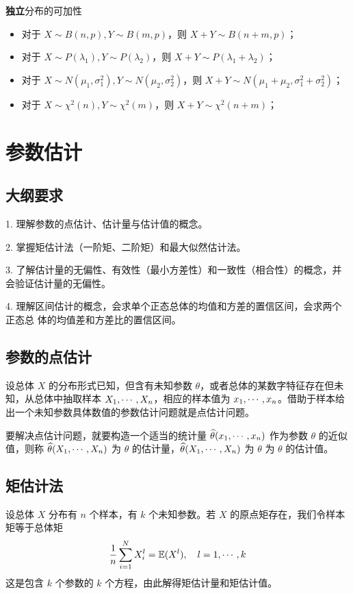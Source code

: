 \textbf{独立}分布的可加性
\begin{itemize}
	\item 对于 $X \sim B(n,p), Y \sim B(m, p)$，则 $X+Y \sim B(n+m,p)$；
	\item 对于 $X \sim P(\lambda_1), Y \sim P(\lambda_2)$，则 $X+Y \sim P(\lambda_1 + \lambda_2)$；
	\item 对于 $X \sim N(\mu_1, \sigma_1^2), Y \sim N(\mu_2, \sigma_2^2)$，则 $X+Y \sim N(\mu_1+\mu_2, \sigma_1^2+\sigma_2^2)$；
	\item 对于 $X \sim \chi^2(n), Y \sim \chi^2(m)$，则 $X+Y \sim \chi^2(n+m)$；
\end{itemize}

\section{参数估计}

\subsection{大纲要求}

1. 理解参数的点估计、估计量与估计值的概念。

2. 掌握矩估计法（一阶矩、二阶矩）和最大似然估计法。

3. 了解估计量的无偏性、有效性（最小方差性）和一致性（相合性）的概念，并会验证估计量的无偏性。

4. 理解区间估计的概念，会求单个正态总体的均值和方差的置信区间，会求两个正态总
体的均值差和方差比的置信区间。

\subsection{参数的点估计}

设总体 $X$ 的分布形式已知，但含有未知参数 $\theta$，或者总体的某数字特征存在但未知，从总体中抽取样本 $X_1,\cdots,X_n$，相应的样本值为 $x_1,\cdots,x_n$。借助于样本给出一个未知参数具体数值的参数估计问题就是点估计问题。

要解决点估计问题，就要构造一个适当的统计量 $\widehat{\theta}(x_1,\cdots,x_n)$ 作为参数 $\theta$ 的近似值，则称 $\widehat{\theta}(X_1,\cdots,X_n)$ 为 $\theta$ 的估计量，$\widehat{\theta}(X_1,\cdots,X_n)$ 为 $\theta$ 为 $\theta$ 的估计值。

\subsection{矩估计法}

设总体 $X$ 分布有 $n$ 个样本，有 $k$ 个未知参数。若 $X$ 的原点矩存在，我们令样本矩等于总体矩
\[ \frac{1}{n} \sum_{i=1}^{N} X_i^l = \mathbb{E}(X^l), \quad l = 1, \cdots, k \]
这是包含 $k$ 个参数的 $k$ 个方程，由此解得矩估计量和矩估计值。

